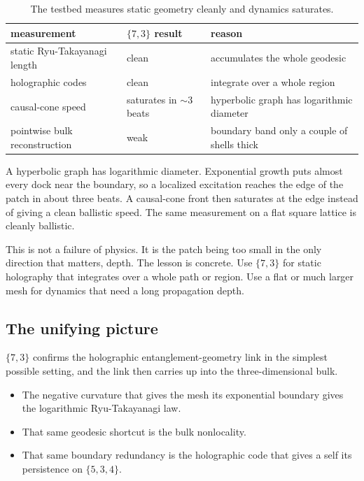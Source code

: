 \begin{table}[ht]
\centering
\begin{tabular}{@{}lll@{}}
\toprule
measurement & $\{7,3\}$ result & reason \\
\midrule
static Ryu-Takayanagi length & clean & accumulates the whole geodesic \\
holographic codes & clean & integrate over a whole region \\
causal-cone speed & saturates in $\sim 3$ beats & hyperbolic graph has logarithmic diameter \\
pointwise bulk reconstruction & weak & boundary band only a couple of shells thick \\
\bottomrule
\end{tabular}
\caption{The testbed measures static geometry cleanly and dynamics saturates.}
\label{tab:hol-limits}
\end{table}

A hyperbolic graph has logarithmic diameter. Exponential growth puts almost every dock near the boundary, so a localized excitation reaches the edge of the patch in about three beats. A causal-cone front then saturates at the edge instead of giving a clean ballistic speed. The same measurement on a flat square lattice is cleanly ballistic.

This is not a failure of physics. It is the patch being too small in the only direction that matters, depth. The lesson is concrete. Use $\{7,3\}$ for static holography that integrates over a whole path or region. Use a flat or much larger mesh for dynamics that need a long propagation depth.

\subsection{The unifying picture}

$\{7,3\}$ confirms the holographic entanglement-geometry link in the simplest possible setting, and the link then carries up into the three-dimensional bulk.

\begin{itemize}
\item The negative curvature that gives the mesh its exponential boundary gives the logarithmic Ryu-Takayanagi law.
\item That same geodesic shortcut is the bulk nonlocality.
\item That same boundary redundancy is the holographic code that gives a self its persistence on $\{5,3,4\}$.
\end{itemize}

